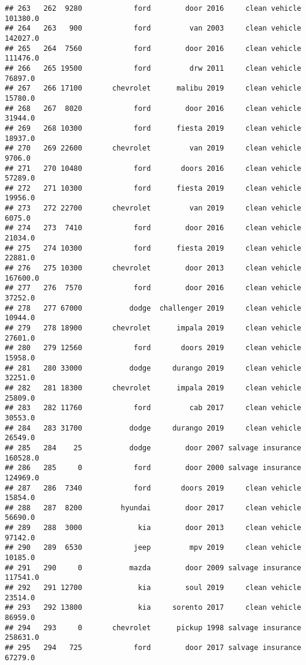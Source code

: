 \documentclass[
]{article}
\begin{document}
\begin{verbatim}
## 263   262  9280            ford        door 2016     clean vehicle  101380.0
## 264   263   900            ford         van 2003     clean vehicle  142027.0
## 265   264  7560            ford        door 2016     clean vehicle  111476.0
## 266   265 19500            ford         drw 2011     clean vehicle   76897.0
## 267   266 17100       chevrolet      malibu 2019     clean vehicle   15780.0
## 268   267  8020            ford        door 2016     clean vehicle   31944.0
## 269   268 10300            ford      fiesta 2019     clean vehicle   18937.0
## 270   269 22600       chevrolet         van 2019     clean vehicle    9706.0
## 271   270 10480            ford       doors 2016     clean vehicle   57289.0
## 272   271 10300            ford      fiesta 2019     clean vehicle   19956.0
## 273   272 22700       chevrolet         van 2019     clean vehicle    6075.0
## 274   273  7410            ford        door 2016     clean vehicle   21034.0
## 275   274 10300            ford      fiesta 2019     clean vehicle   22881.0
## 276   275 10300       chevrolet        door 2013     clean vehicle  167600.0
## 277   276  7570            ford        door 2016     clean vehicle   37252.0
## 278   277 67000           dodge  challenger 2019     clean vehicle   10944.0
## 279   278 18900       chevrolet      impala 2019     clean vehicle   27601.0
## 280   279 12560            ford       doors 2019     clean vehicle   15958.0
## 281   280 33000           dodge     durango 2019     clean vehicle   32251.0
## 282   281 18300       chevrolet      impala 2019     clean vehicle   25809.0
## 283   282 11760            ford         cab 2017     clean vehicle   30553.0
## 284   283 31700           dodge     durango 2019     clean vehicle   26549.0
## 285   284    25           dodge        door 2007 salvage insurance  160528.0
## 286   285     0            ford        door 2000 salvage insurance  124969.0
## 287   286  7340            ford       doors 2019     clean vehicle   15854.0
## 288   287  8200         hyundai        door 2017     clean vehicle   56690.0
## 289   288  3000             kia        door 2013     clean vehicle   97142.0
## 290   289  6530            jeep         mpv 2019     clean vehicle   10185.0
## 291   290     0           mazda        door 2009 salvage insurance  117541.0
## 292   291 12700             kia        soul 2019     clean vehicle   23514.0
## 293   292 13800             kia     sorento 2017     clean vehicle   86959.0
## 294   293     0       chevrolet      pickup 1998 salvage insurance  258631.0
## 295   294   725            ford        door 2017 salvage insurance   67279.0

\end{verbatim}
\end{document}
